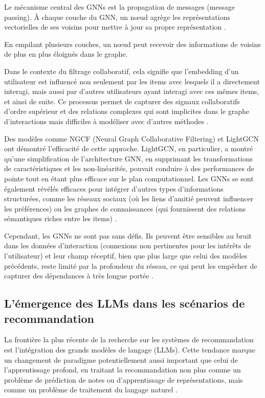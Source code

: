 Le mécanisme central des GNNs est la propagation de messages (message passing). À chaque couche du GNN, un nœud agrège les représentations vectorielles de ses voisins pour mettre à jour sa propre représentation \citep{Gilmer2017}.

En empilant plusieurs couches, un nœud peut recevoir des informations de voisins de plus en plus éloignés dans le graphe.

Dans le contexte du filtrage collaboratif, cela signifie que l'embedding d'un utilisateur est influencé non seulement par les items avec lesquels il a directement interagi, mais aussi par d'autres utilisateurs ayant interagi avec ces mêmes items, et ainsi de suite. Ce processus permet de capturer des signaux collaboratifs d'ordre supérieur et des relations complexes qui sont implicites dans le graphe d'interactions mais difficiles à modéliser avec d'autres méthodes \citep{Wang2019, He2020}.

Des modèles comme NGCF (Neural Graph Collaborative Filtering) \citet{Wang2019} et LightGCN \citet{He2020} ont démontré l'efficacité de cette approche. LightGCN, en particulier, a montré qu'une simplification de l'architecture GNN, en supprimant les transformations de caractéristiques et les non-linéarités, pouvait conduire à des performances de pointe tout en étant plus efficace sur le plan computationnel. Les GNNs se sont également révélés efficaces pour intégrer d'autres types d'informations structurées, comme les réseaux sociaux (où les liens d'amitié peuvent influencer les préférences) ou les graphes de connaissances (qui fournissent des relations sémantiques riches entre les items) \citep{Fan2019, Wang2019a}.

Cependant, les GNNs ne sont pas sans défis. Ils peuvent être sensibles au bruit dans les données d'interaction (connexions non pertinentes pour les intérêts de l'utilisateur) et leur champ réceptif, bien que plus large que celui des modèles précédents, reste limité par la profondeur du réseau, ce qui peut les empêcher de capturer des dépendances à très longue portée \citep{Ying2018, Wu2022}.

\subsection{L'émergence des LLMs dans les scénarios de recommandation}

La frontière la plus récente de la recherche sur les systèmes de recommandation est l'intégration des grands modèles de langage (LLMs). Cette tendance marque un changement de paradigme potentiellement aussi important que celui de l'apprentissage profond, en traitant la recommandation non plus comme un problème de prédiction de notes ou d'apprentissage de représentations, mais comme un problème de traitement du langage naturel \citep{Geng2022}.

